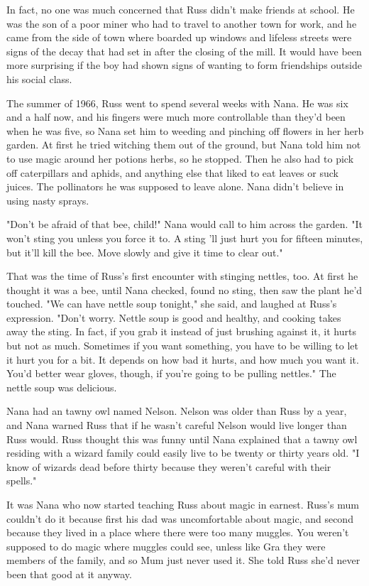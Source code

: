 \documentclass[a4paper,11pt]{article}
\begin{document}
In fact, no one was much concerned that Russ didn't make friends at school. He was the son of a poor miner who had to travel to another town for work, and he came from the side of town where boarded up windows and lifeless streets were signs of the decay that had set in after the closing of the mill. It would have been more surprising if the boy had shown signs of wanting to form friendships outside his social class.

The summer of 1966, Russ went to spend several weeks with Nana. He was six and a half now, and his fingers were much more controllable than they'd been when he was five, so Nana set him to weeding and pinching off flowers in her herb garden. At first he tried witching them out of the ground, but Nana told him not to use magic around her potions herbs, so he stopped. Then he also had to pick off caterpillars and aphids, and anything else that liked to eat leaves or suck juices. The pollinators he was supposed to leave alone. Nana didn't believe in using nasty sprays.

"Don't be afraid of that bee, child!" Nana would call to him across the garden. "It won't sting you unless you force it to. A sting 'll just hurt you for fifteen minutes, but it'll kill the bee. Move slowly and give it time to clear out."

That was the time of Russ's first encounter with stinging nettles, too. At first he thought it was a bee, until Nana checked, found no sting, then saw the plant he'd touched. "We can have nettle soup tonight," she said, and laughed at Russ's expression. "Don't worry. Nettle soup is good and healthy, and cooking takes away the sting. In fact, if you grab it instead of just brushing against it, it hurts but not as much. Sometimes if you want something, you have to be willing to let it hurt you for a bit. It depends on how bad it hurts, and how much you want it. You'd better wear gloves, though, if you're going to be pulling nettles." The nettle soup was delicious.

Nana had an tawny owl named Nelson. Nelson was older than Russ by a year, and Nana warned Russ that if he wasn't careful Nelson would live longer than Russ would. Russ thought this was funny until Nana explained that a tawny owl residing with a wizard family could easily live to be twenty or thirty years old. "I know of wizards dead before thirty because they weren't careful with their spells."

It was Nana who now started teaching Russ about magic in earnest. Russ's mum couldn't do it because first his dad was uncomfortable about magic, and second because they lived in a place where there were too many muggles. You weren't supposed to do magic where muggles could see, unless like Gra they were members of the family, and so Mum just never used it. She told Russ she'd never been that good at it anyway.
\end{document}
